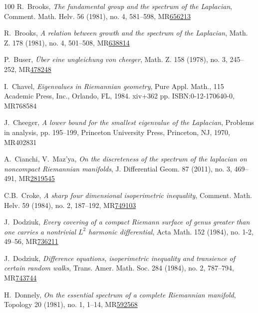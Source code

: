 \documentclass[a4paper,11pt,reqno]{amsart}
\theoremstyle{plain}
\numberwithin{equation}{section} \allowdisplaybreaks
\begin{document}
\begin{thebibliography}{100}
 R.~Brooks, \emph{The fundamental group and the spectrum of the Laplacian}, Comment. Math. Helv. 56 (1981), no. 4, 581–598, MR\href{https://doi.org/10.1007/BF02566228}{656213}



 R.~Brooks, \emph{A relation between growth and the spectrum of the Laplacian}, Math. Z. 178 (1981), no. 4, 501–508, MR\href{https://doi.org/10.1007/BF01174771}{638814}



 P.~Buser, \emph{Über eine ungleichung von cheeger}, Math. Z. 158 (1978), no. 3, 245–252, MR\href{https://doi.org/10.1007/BF01214795}{478248}





 I.~Chavel, \emph{Eigenvalues in Riemannian geometry}, Pure Appl. Math., 115
Academic Press, Inc., Orlando, FL, 1984. xiv+362 pp.
ISBN:0-12-170640-0, MR{768584}

 J.~Cheeger, \emph{A lower bound for the smallest eigenvalue of the Laplacian}, Problems in analysis, pp. 195–199, Princeton University Press, Princeton, NJ, 1970, MR{402831}

 A.~Cianchi, V.~Maz'ya, \emph{On the discreteness of the spectrum of the laplacian on noncompact Riemannian manifolds}, J. Differential Geom. 87 (2011), no. 3, 469–491, MR\href{http://projecteuclid.org/euclid.jdg/1312998232}{2819545}

 C.B.~Croke, \emph{A sharp four dimensional isoperimetric inequality}, Comment. Math. Helv. 59 (1984), no. 2, 187–192, MR\href{https://doi.org/10.1007/BF02566344}{749103}



 J.~Dodziuk, \emph{Every covering of a compact Riemann surface of genus greater than one carries a nontrivial $L^2$ harmonic differential}, Acta Math. 152 (1984), no. 1-2, 49–56, MR\href{https://doi.org/10.1007/BF02392190}{736211}



 J.~Dodziuk, \emph{Difference equations, isoperimetric inequality and transience of certain random walks}, Trans. Amer. Math. Soc. 284 (1984), no. 2, 787–794, MR\href{https://doi.org/10.2307/1999107}{743744}



 H.~Donnely, \emph{On the essential spectrum of a complete Riemannian manifold}, Topology 20 (1981), no. 1, 1–14, MR\href{https://doi.org/10.1016/0040-9383(81)90012-4}{592568}




\end{thebibliography}
\end{document}

